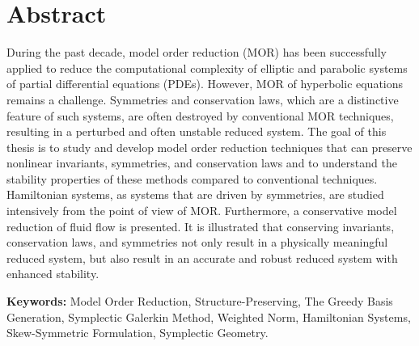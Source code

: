 

\cleardoublepage
\chapter*{Abstract}

During the past decade, model order reduction (MOR) has been successfully applied to reduce the computational complexity of elliptic and parabolic systems of partial differential equations (PDEs). However, MOR of hyperbolic equations remains a challenge. Symmetries and conservation laws, which are a distinctive feature of such systems, are often destroyed by conventional MOR techniques, resulting in a perturbed and often unstable reduced system. The goal of this thesis is to study and develop model order reduction techniques that can preserve nonlinear invariants, symmetries, and conservation laws and to understand the stability properties of these methods compared to conventional techniques. Hamiltonian systems, as systems that are driven by symmetries, are studied intensively from the point of view of MOR. Furthermore, a conservative model reduction of fluid flow is presented. It is illustrated that conserving invariants, conservation laws, and symmetries not only result in a physically meaningful reduced system, but also result in an accurate and robust reduced system with enhanced stability.

\vspace{1cm}

\textbf{Keywords:} Model Order Reduction, Structure-Preserving, The Greedy Basis Generation, Symplectic Galerkin Method, Weighted Norm, Hamiltonian Systems, Skew-Symmetric Formulation, Symplectic Geometry.





